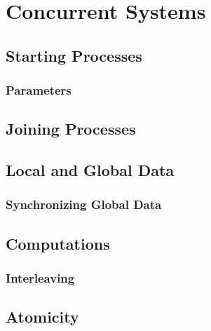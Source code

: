 \documentclass[a4paper, 11pt, accentcolor = tud3b]{tudreport}
\begin{document}
        \section{Concurrent Systems} %

            \subsection{Starting Processes} %

                \subsubsection{Parameters} %

            \subsection{Joining Processes} %

            \subsection{Local and Global Data} %

                \subsubsection{Synchronizing Global Data} %

            \subsection{Computations} %

                \subsubsection{Interleaving} %

            \subsection{Atomicity} %
\end{document}
